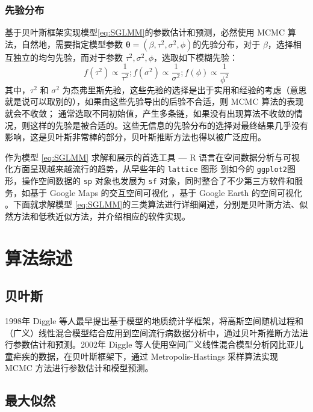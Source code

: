 \documentclass[hyperref, a4paper, UTF8, zihao = -4, linespread = 1.25, scheme = chinese]{ctexbook}
\begin{document}
\subsection{先验分布}

基于贝叶斯框架实现模型\eqref{eq:SGLMM}的参数估计和预测，必然使用 MCMC
算法，自然地，需要指定模型参数
\(\bm{\theta} = (\beta,\tau^2,\sigma^2,\phi)\)的先验分布，对于
\(\beta\)，选择相互独立的均匀先验，而对于参数
\(\tau^2,\sigma^2,\phi\)，选取如下模糊先验：
\[f(\tau^2) \propto \frac{1}{\tau^2};f(\sigma^2) \propto \frac{1}{\sigma^2};f(\phi) \propto \frac{1}{\phi^2}\]
其中，\(\tau^2\) 和 \(\sigma^2\)
为杰弗里斯先验，这些先验的选择是出于实用和经验的考虑（意思就是说可以取别的），如果由这些先验导出的后验不合适，则
MCMC 算法的表现就会不收敛；
通常选取不同初始值，产生多条链，如果没有出现算法不收敛的情况，则这样的先验是被合适的。这些无信息的先验分布的选择对最终结果几乎没有影响，这是贝叶斯非常棒的部分，贝叶斯推断方法也得以被广泛应用\citep{mao2006}。

作为模型 \eqref{eq:SGLMM} 求解和展示的首选工具 --- R
语言在空间数据分析与可视化方面呈现越来越流行的趋势，从早些年的
\texttt{lattice} 图形\citep{lattice2008} 到如今的
\texttt{ggplot2}图形\citep{ggplot22016}，操作空间数据的 \texttt{sp}
对象\citep{R-sp}也发展为 \texttt{sf}
对象\citep{R-sf}，同时整合了不少第三方软件和服务，如基于 Google Maps
的交互空间可视化 \citep{plotGoogleMaps2012}，基于 Google Earth
的空间可视化 \citep{plotKML2015}。下面就求解模型
\eqref{eq:SGLMM}的三类算法进行详细阐述，分别是贝叶斯方法、似然方法和低秩近似方法，并介绍相应的软件实现。

\hypertarget{algorithms}{%
\chapter{算法综述}\label{algorithms}}

\hypertarget{bayes}{%
\section{贝叶斯}\label{bayes}}

1998年 Diggle
等人最早提出基于模型的地质统计学框架，将高斯空间随机过程和（广义）线性混合模型结合应用到空间流行病数据分析中，通过贝叶斯推断方法进行参数估计和预测\citep{Diggle1998}。2002年
Diggle
等人使用空间广义线性混合模型分析冈比亚儿童疟疾的数据，在贝叶斯框架下，通过
Metropolis-Hastings 采样算法实现 MCMC
方法进行参数估计和模型预测\citep{Diggle2002}。

\hypertarget{likelihood}{%
\section{最大似然}\label{likelihood}}
\end{document}
